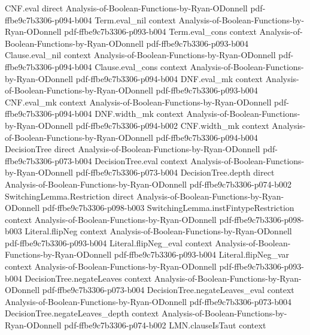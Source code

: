 \begin{lemma}
\proofstep
  {CNF.eval}
  {direct}
  {Analysis-of-Boolean-Functions-by-Ryan-ODonnell}
  {pdf-ffbe9c7b3306-p094-b004}
\proofstep
  {Term.eval_nil}
  {context}
  {Analysis-of-Boolean-Functions-by-Ryan-ODonnell}
  {pdf-ffbe9c7b3306-p093-b004}
\proofstep
  {Term.eval_cons}
  {context}
  {Analysis-of-Boolean-Functions-by-Ryan-ODonnell}
  {pdf-ffbe9c7b3306-p093-b004}
\proofstep
  {Clause.eval_nil}
  {context}
  {Analysis-of-Boolean-Functions-by-Ryan-ODonnell}
  {pdf-ffbe9c7b3306-p094-b004}
\proofstep
  {Clause.eval_cons}
  {context}
  {Analysis-of-Boolean-Functions-by-Ryan-ODonnell}
  {pdf-ffbe9c7b3306-p094-b004}
\proofstep
  {DNF.eval_mk}
  {context}
  {Analysis-of-Boolean-Functions-by-Ryan-ODonnell}
  {pdf-ffbe9c7b3306-p093-b004}
\proofstep
  {CNF.eval_mk}
  {context}
  {Analysis-of-Boolean-Functions-by-Ryan-ODonnell}
  {pdf-ffbe9c7b3306-p094-b004}
\proofstep
  {DNF.width_mk}
  {context}
  {Analysis-of-Boolean-Functions-by-Ryan-ODonnell}
  {pdf-ffbe9c7b3306-p094-b002}
\proofstep
  {CNF.width_mk}
  {context}
  {Analysis-of-Boolean-Functions-by-Ryan-ODonnell}
  {pdf-ffbe9c7b3306-p094-b004}
\proofstep
  {DecisionTree}
  {direct}
  {Analysis-of-Boolean-Functions-by-Ryan-ODonnell}
  {pdf-ffbe9c7b3306-p073-b004}
\proofstep
  {DecisionTree.eval}
  {context}
  {Analysis-of-Boolean-Functions-by-Ryan-ODonnell}
  {pdf-ffbe9c7b3306-p073-b004}
\proofstep
  {DecisionTree.depth}
  {direct}
  {Analysis-of-Boolean-Functions-by-Ryan-ODonnell}
  {pdf-ffbe9c7b3306-p074-b002}
\proofstep
  {SwitchingLemma.Restriction}
  {direct}
  {Analysis-of-Boolean-Functions-by-Ryan-ODonnell}
  {pdf-ffbe9c7b3306-p098-b003}
\proofstep
  {SwitchingLemma.instFintypeRestriction}
  {context}
  {Analysis-of-Boolean-Functions-by-Ryan-ODonnell}
  {pdf-ffbe9c7b3306-p098-b003}
\proofstep
  {Literal.flipNeg}
  {context}
  {Analysis-of-Boolean-Functions-by-Ryan-ODonnell}
  {pdf-ffbe9c7b3306-p093-b004}
\proofstep
  {Literal.flipNeg_eval}
  {context}
  {Analysis-of-Boolean-Functions-by-Ryan-ODonnell}
  {pdf-ffbe9c7b3306-p093-b004}
\proofstep
  {Literal.flipNeg_var}
  {context}
  {Analysis-of-Boolean-Functions-by-Ryan-ODonnell}
  {pdf-ffbe9c7b3306-p093-b004}
\proofstep
  {DecisionTree.negateLeaves}
  {context}
  {Analysis-of-Boolean-Functions-by-Ryan-ODonnell}
  {pdf-ffbe9c7b3306-p073-b004}
\proofstep
  {DecisionTree.negateLeaves_eval}
  {context}
  {Analysis-of-Boolean-Functions-by-Ryan-ODonnell}
  {pdf-ffbe9c7b3306-p073-b004}
\proofstep
  {DecisionTree.negateLeaves_depth}
  {context}
  {Analysis-of-Boolean-Functions-by-Ryan-ODonnell}
  {pdf-ffbe9c7b3306-p074-b002}
\proofstep
  {LMN.clauseIsTaut}
  {context}

\end{lemma}
